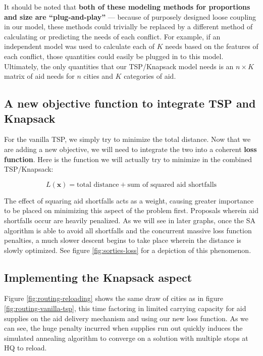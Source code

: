 \documentclass{article} %
\begin{document}
It should be noted that \textbf{both of these modeling methods for proportions and size are ``plug-and-play''} --- because of purposely designed loose coupling in our model, these methods could trivially be replaced by a different method of calculating or predicting the needs of each conflict. For example, if an independent model was used to calculate each of $K$ needs based on the features of each conflict, those quantities could easily be plugged in to this model. Ultimately, the only quantities that our TSP/Knapsack model needs is an $n \times K$ matrix of aid needs for $n$ cities and $K$ categories of aid.

\subsection{A new objective function to integrate TSP and Knapsack}

For the vanilla TSP, we simply try to minimize the total distance. Now that we are adding a new objective, we will need to integrate the two into a coherent \textbf{loss function}.  Here is the function we will actually try to minimize in the combined TSP/Knapsack:

$$L(\boldsymbol x) = \text{total distance} + \text{sum of squared aid shortfalls}$$

The effect of squaring aid shortfalls acts as a weight, causing greater importance to be placed on minimizing this aspect of the problem first. Proposals wherein aid shortfalls occur are heavily penalized. As we will see in later graphs, once the SA algorithm is able to avoid all shortfalls and the concurrent massive loss function penalties, a much slower descent begins to take place wherein the distance is slowly optimized. See figure \ref{fig:sorties-loss} for a depiction of this phenomenon.

\subsection{Implementing the Knapsack aspect}

Figure \ref{fig:routing-reloading} shows the same draw of cities as in figure \ref{fig:routing-vanilla-tsp}, this time factoring in limited carrying capacity for aid supplies on the aid delivery mechanism and using our new loss function. As we can see, the huge penalty incurred when supplies run out quickly induces the simulated annealing algorithm to converge on a solution with multiple stops at HQ to reload.
\end{document}

